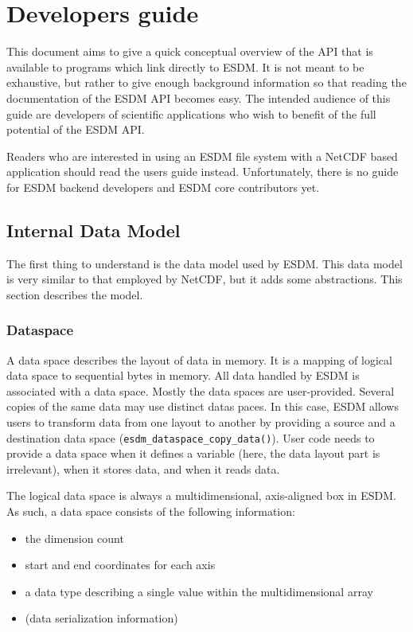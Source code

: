 \section{Developers guide}
This document aims to give a quick conceptual overview of the API that is available to programs which link directly to ESDM. 
It is not meant to be exhaustive, but rather to give enough background information so that reading the documentation of the ESDM API becomes easy. 
The intended audience of this guide are developers of scientific applications who wish to benefit of the full potential of the ESDM API.

Readers who are interested in using an ESDM file system with a NetCDF based application should read the users guide instead. 
Unfortunately, there is no guide for ESDM backend developers and ESDM core contributors yet.

\subsection{Internal Data Model}

The first thing to understand is the data model used by ESDM.
This data model is very similar to that employed by NetCDF, but it adds some abstractions.
This section describes the model.

\subsubsection{Dataspace}
\label{sec:user-guides:data-space}

A data space describes the layout of data in memory.
It is a mapping of logical data space to sequential bytes in memory.
All data handled by ESDM is associated with a data space.
Mostly the data spaces are user-provided. 
Several copies of the same data may use distinct datas paces.
In this case, ESDM allows users to transform data from one layout to another by providing a source and a destination data space (\lstinline|esdm_dataspace_copy_data()|). 
User code needs to provide a data space when it defines a variable (here, the data layout part is irrelevant), when it stores data, and when it reads data.

The logical data space is always a multidimensional, axis-aligned box in ESDM. 
As such, a data space consists of the following information:

\begin{itemize}
  \item the dimension count
  \item start and end coordinates for each axis
  \item a data type describing a single value within the multidimensional array
  \item (data serialization information)
\end{itemize}

